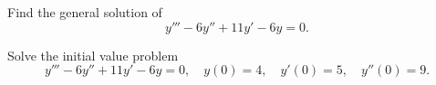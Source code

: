 \setcounter{example}{0}
\setcounter{equation}{2}
\begin{example}
  \label{example:9.2.1} \rm \mbox{}
  \newline
  \begin{alist}
    \item %
    Find the general solution of
    \begin{equation}
      \label{eq:9.2.3}y'''-6y''+11y'-6y=0.
    \end{equation}

    \item %
    Solve the initial value problem
    \begin{equation}
      \label{eq:9.2.4}y'''-6y''+11y'-6y=0,\quad y(0)=4,\quad y'(0)=5,\quad y''(0)=9.
    \end{equation}
  \end{alist}
\end{example}
\setcounter{equation}{4}
\setcounter{figure}{0}

